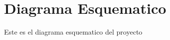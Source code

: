 \documentclass[../informe_krapp.tex]{subfiles}
\begin{document}
\graphicspath{{../images/}}
\section{Diagrama Esquematico}
Este es el diagrama esquematico del proyecto
\end{document}
